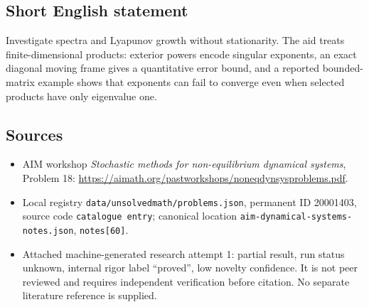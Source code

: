 \documentclass[11pt]{article}
\begin{document}
\subsection{Short English statement}
Investigate spectra and Lyapunov growth without stationarity. The aid treats finite-dimensional products: exterior powers encode singular exponents, an exact diagonal moving frame gives a quantitative error bound, and a reported bounded-matrix example shows that exponents can fail to converge even when selected products have only eigenvalue one.
\subsection{Sources}
\begin{itemize}
\item AIM workshop \emph{Stochastic methods for non-equilibrium dynamical systems}, Problem 18: \url{https://aimath.org/pastworkshops/noneqdynsysproblems.pdf}.
\item Local registry \texttt{data/unsolvedmath/problems.json}, permanent ID 20001403, source code \texttt{catalogue entry}; canonical location \texttt{aim-dynamical-systems-notes.json}, \texttt{notes[60]}.
\item Attached machine-generated research attempt 1: partial result, run status unknown, internal rigor label ``proved'', low novelty confidence. It is not peer reviewed and requires independent verification before citation. No separate literature reference is supplied.
\end{itemize}
\end{document}
